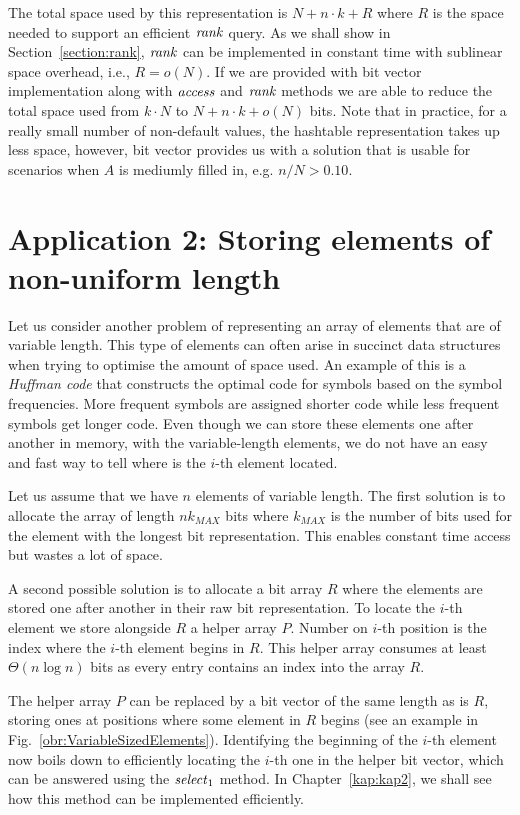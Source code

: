 The total space used by this representation is $N+n\cdot k+R$ where $R$ is the space needed to
support an efficient $\mathit{rank}$ query. As we shall show in Section~\ref{section:rank}, $\mathit{rank}$ can
be implemented in constant time with sublinear space overhead, i.e., $R = o(N)$. If we are provided
with bit vector implementation along with $\mathit{access}$ and $\mathit{rank}$ methods we are able to reduce the
total space used from $k\cdot N$ to $N+n\cdot k+o(N)$ bits. Note that in practice, for a really small
number of non-default values, the hashtable representation takes up less space, however, bit
vector provides us with a solution that is usable for scenarios when $A$ is mediumly filled in,
e.g. $n/N>0.10$.

\section{Application 2: Storing elements of non-uniform length}

Let us consider another problem of representing an array of elements that are of variable length.
This type of elements can often arise in succinct data structures when trying to
optimise the amount of space used. An example of this is a \textit{Huffman code} \citep{huffman1952method}
that constructs the optimal code for symbols based on the symbol frequencies. More frequent
symbols are assigned shorter code while less frequent symbols get longer code.
Even though we can store these elements one after another in memory, with the variable-length
elements, we do not have an easy and fast way to tell where is the $i$-th element located.

Let us assume that we have $n$ elements of variable length. The first solution is to allocate
the array of length $nk_{MAX}$ bits where $k_{MAX}$ is the number of bits used for the element
with the longest bit representation. This enables constant time access but wastes a lot of space.

A second possible solution is to allocate a bit array $R$ where the elements are stored one after
another in their raw bit representation. To locate the $i$-th element we store alongside $R$ a
helper array $P$. Number on $i$-th position is the index where the $i$-th element begins in $R$.
This helper array consumes at least $\Theta(n\log n)$ bits as every entry contains an index into
the array $R$.

The helper array $P$ can be replaced by a bit vector of the same length as is $R$, storing ones at
positions where some element in $R$ begins (see an example in Fig.~\ref{obr:VariableSizedElements}).
Identifying the beginning of the $i$-th element now boils down to efficiently locating the
$i$-th one in the helper bit vector, which can be answered using the $\mathit{select}_1$ method.
In Chapter~\ref{kap:kap2}, we shall see how this method can be implemented efficiently.

